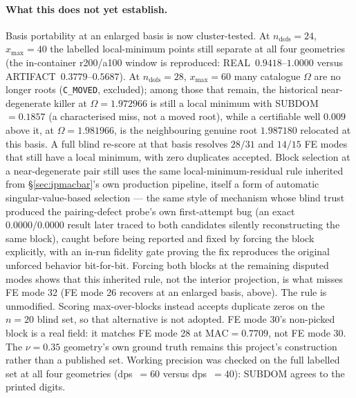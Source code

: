 \documentclass[11pt]{article}
\begin{document}
\paragraph{What this does not yet establish.} Basis portability at an
enlarged basis is now cluster-tested. At $n_{\mathrm{dofs}}=24$,
$x_{\max}=40$ the labelled local-minimum points still separate at all
four geometries (the in-container r200/a100 window is reproduced:
REAL~$0.9418$--$1.0000$ versus ARTIFACT~$0.3779$--$0.5687$). At
$n_{\mathrm{dofs}}=28$, $x_{\max}=60$ many catalogue $\Omega$ are no
longer roots (\texttt{C\_MOVED}, excluded); among those that remain, the
historical near-degenerate killer at $\Omega=1.972966$ is still a local
minimum with SUBDOM~$=0.1857$ (a characterised miss, not a moved root),
while a certifiable well $0.009$ above it, at $\Omega=1.981966$, is the
neighbouring genuine root $1.987180$ relocated at this basis. A full blind re-score at that
basis resolves $28/31$ and $14/15$ FE modes that still have a local
minimum, with zero duplicates accepted. Block selection at a near-degenerate pair
still uses the
same local-minimum-residual rule inherited from \S\ref{sec:ipmacbar}'s own
production pipeline, itself a form of automatic singular-value-based
selection --- the same style of mechanism whose blind trust produced the
pairing-defect probe's own first-attempt bug (an exact
0.0000/0.0000 result later traced to both candidates silently
reconstructing the same block), caught before being reported and fixed by
forcing the block explicitly, with an in-run fidelity gate proving the fix
reproduces the original unforced behavior bit-for-bit. Forcing both
blocks at the remaining disputed modes shows that this inherited rule,
not the interior projection, is what misses FE mode 32 (FE mode 26
recovers at an enlarged basis, above). The
rule is unmodified. Scoring max-over-blocks instead accepts duplicate
zeros on the $n=20$ blind set, so that alternative is not adopted.
FE mode 30's non-picked block is a real field: it matches FE mode 28
at $\mathrm{MAC}=0.7709$, not FE mode 30. The $\nu=0.35$
geometry's own ground truth remains this project's construction rather
than a published set. Working precision was checked on the full labelled
set at all four geometries (dps~$=60$ versus dps~$=40$): SUBDOM agrees
to the printed digits.
\end{document}
